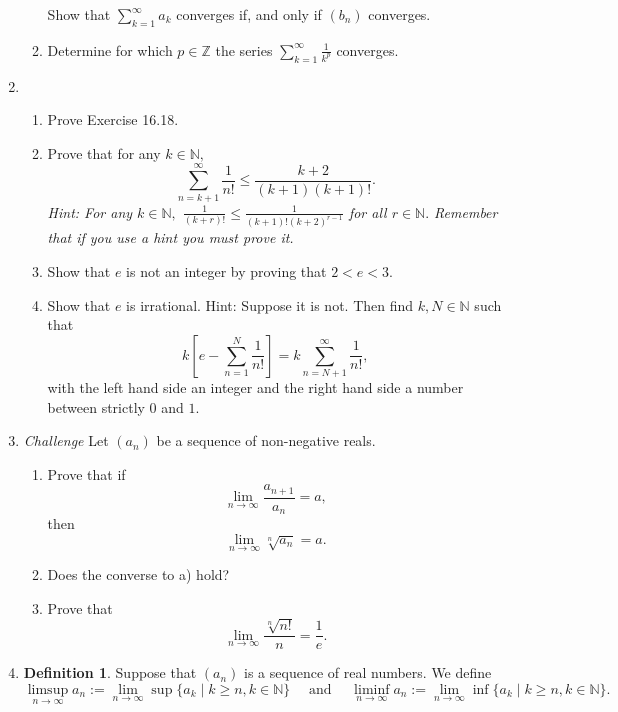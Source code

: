 \documentclass[openany, amssymb, psamsfonts]{amsart}
\newcommand{\bbN}{\mathbb{N}}
\newcommand{\bbZ}{\mathbb{Z}}
\theoremstyle{definition}
\newtheorem{defn}{Definition}[section]
\numberwithin{equation}{section}
\begin{document}
\begin{enumerate}
\begin{enumerate}
Show that $\displaystyle \sum_{k=1}^\infty a_k$ converges if, and only if $(b_n)$ converges.
\item Determine for which $p\in \bbZ$ the series $\displaystyle \sum_{k=1}^\infty \frac{1}{k^p}$ converges.
\end{enumerate}

\item
\begin{enumerate}
\item Prove Exercise 16.18.
\item Prove that for any $k\in \bbN,$
$$\sum_{n=k+1}^\infty \frac{1}{n!} \leq  \frac{k+2}{(k+1)(k+1)!}.$$
{\it Hint: For any $k\in\bbN,$ $\frac{1}{(k+r)!} \leq  \frac{1}{(k+1)! (k+2)^{r-1}}$ for all $r\in \bbN.$ Remember that if you use a hint you must prove it.}
\item Show that $e$ is not an integer by proving that $2<e<3.$
\item Show that $e$ is irrational.  Hint: Suppose it is not. Then find $k, N\in \bbN$  such that
\[
	k \left[ e -  \sum_{n=1}^{N} \frac{1}{n!}\right] = k \sum_{n=N+1}^\infty \frac{1}{n!},
\]
with the left hand side an integer and the right hand side a number between strictly $0$ and $1$.\end{enumerate}

\item {\em Challenge} Let $(a_n)$ be a sequence of non-negative reals.
\begin{enumerate}
\item Prove that if $$\lim_{n \longrightarrow \infty}\frac{a_{n+1}}{a_n}=a,$$ then  $$\lim_{n \longrightarrow\infty}\sqrt[n]{a_n}=a.$$
\item Does the converse to a) hold?
\item Prove that 
$$
\lim_{n \longrightarrow \infty}\frac{\sqrt[n]{n!}}{n}=\frac{1}{e}.
$$ 
\end{enumerate}



\item 


\begin{defn}
	Suppose that $(a_n)$ is a sequence of real numbers.  We define
	\[
		\limsup_{n\to\infty} a_n := \lim_{n \to \infty} \sup \{a_k \mid k \geq n, k \in \bbN\}
		\quad \text{ and } \quad
		\liminf_{n\to\infty} a_n := \lim_{n \to \infty} \inf \{a_k \mid k \geq n, k \in \bbN\}.
	\]
\end{defn}



\begin{enumerate} 


\end{enumerate}
\end{enumerate}
\end{document}
